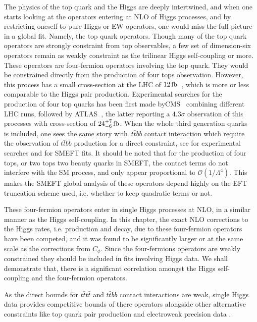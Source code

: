 \par The physics of the top quark and the Higgs are deeply intertwined, and when one starts looking at the operators entering at NLO of Higgs processes,  and by restricting oneself to pure Higgs or EW operators, one would miss the full picture in a global fit. Namely, the top quark operators. Though many of the top quark operators are strongly constraint from top observables, a few set of dimension-six operators remain as weakly constraint as the trilinear Higgs self-coupling or more. These operators are four-fermion operators involving the top quark. They would be constrained directly from the production of four tops observation. However, this process has a small cross-section at the LHC of $12\, \femtobarn$~\cite{Frederix:2017wme}, which is more or less comparable to the Higgs pair production. Experimental searches for the production of four top quarks has been first made byCMS~\cite{Sirunyan:2019nxl} combining different LHC runs, followed by ATLAS~\cite{Aad:2020klt}, the latter reporting a $4.3 \sigma$ observation of this processes with cross-section of $24^{+7}_{-6}\,\femtobarn$. When the whole third generation quarks is included, one sees the same story with~$t\bar{t}b\bar{b}$  contact interaction which require the observation of $t\bar{t}b\bar{b}$ production for a direct constraint, see \cite{Sirunyan:2020kgar, ATLAS:2018gug} for experimental searches and \cite{DHondt:2018cww, Hartland:2019bjb} for SMEFT fits. It should be noted that for the production of four tops, or two tops two beauty quarks in SMEFT, the contact terms do not interfere with the SM process, and only appear proportional to $\mathcal{O}(1/\Lambda^4)$. This makes the SMEFT global analysis of these operators depend highly on the EFT truncation scheme used, i.e. whether to keep quadratic terms or not. 
\par These four-fermion operators enter in single Higgs processes at NLO, in a similar manner as the Higgs self-coupling. In this chapter, the exact NLO corrections to the Higgs rates, i.e. production and decay, due to these four-fermion operators have been competed, and it was found to be significantly larger or at the same scale as the corrections from $C_\phi$. Since the four-fermions operators are weakly constrained they should be included in fits involving Higgs data. We shall demonstrate that, there is a significant correlation amongst the Higgs self-coupling and the four-fermion operators.
\par As the direct bounds for  $t\bar{t}t\bar{t}$ and $t\bar{t}b\bar{b}$ contact interactions are weak, single Higgs data provides competitive bounds of there operators alongside other alternative constraints like top quark pair production \cite{Degrande:2020evl} and electroweak precision data \cite{deBlas:2015aea} .
